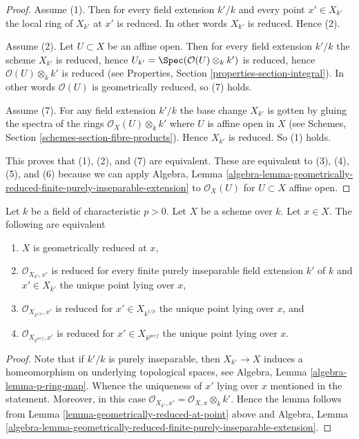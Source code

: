 \begin{proof}
Assume (1). Then for every field extension $k'/k$ and
every point $x' \in X_{k'}$ the local ring of $X_{k'}$ at $x'$
is reduced. In other words $X_{k'}$ is reduced. Hence (2).

\medskip\noindent
Assume (2). Let $U \subset X$ be an affine open. Then for
every field extension $k'/k$ the scheme $X_{k'}$ is reduced, hence
$U_{k'} = \Spec(\mathcal{O}(U)\otimes_k k')$ is reduced,
hence $\mathcal{O}(U)\otimes_k k'$ is reduced (see Properties,
Section \ref{properties-section-integral}). In other words
$\mathcal{O}(U)$ is geometrically reduced, so (7) holds.

\medskip\noindent
Assume (7). For any field extension $k'/k$ the base
change $X_{k'}$ is gotten by gluing the spectra of the
rings $\mathcal{O}_X(U) \otimes_k k'$ where $U$ is affine open
in $X$ (see Schemes, Section \ref{schemes-section-fibre-products}).
Hence $X_{k'}$ is reduced. So (1) holds.

\medskip\noindent
This proves that (1), (2), and (7) are equivalent. These are equivalent
to (3), (4), (5), and (6) because we can apply Algebra, Lemma
\ref{algebra-lemma-geometrically-reduced-finite-purely-inseparable-extension}
to $\mathcal{O}_X(U)$ for $U \subset X$ affine open.
\end{proof}

\begin{lemma}
\label{lemma-check-only-finite-inseparable-extensions}
Let $k$ be a field of characteristic $p > 0$. Let $X$ be a scheme over $k$.
Let $x \in X$. The following are equivalent
\begin{enumerate}
\item $X$ is geometrically reduced at $x$,
\item $\mathcal{O}_{X_{k'}, x'}$ is reduced for every
finite purely inseparable field extension $k'$ of $k$ and
$x' \in X_{k'}$ the unique point lying over $x$,
\item $\mathcal{O}_{X_{k^{1/p}}, x'}$ is reduced for
$x' \in X_{k^{1/p}}$ the unique point lying over $x$, and
\item $\mathcal{O}_{X_{k^{perf}}, x'}$ is reduced for
$x' \in X_{k^{perf}}$ the unique point lying over $x$.
\end{enumerate}
\end{lemma}

\begin{proof}
Note that if $k'/k$ is purely inseparable, then
$X_{k'} \to X$ induces a homeomorphism on underlying topological
spaces, see Algebra, Lemma \ref{algebra-lemma-p-ring-map}.
Whence the uniqueness of $x'$ lying over $x$ mentioned in the
statement. Moreover, in this case
$\mathcal{O}_{X_{k'}, x'} = \mathcal{O}_{X, x} \otimes_k k'$.
Hence the lemma follows from Lemma \ref{lemma-geometrically-reduced-at-point}
above and Algebra, Lemma
\ref{algebra-lemma-geometrically-reduced-finite-purely-inseparable-extension}.
\end{proof}

